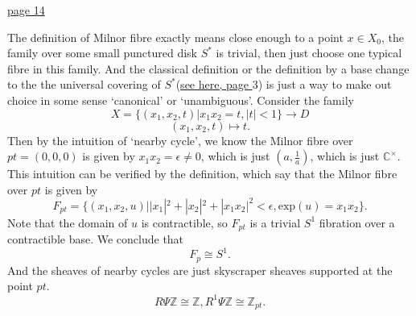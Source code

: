 \documentclass[../main.tex]{subfiles}
\begin{document}
\begin{example}

\end{example}
\begin{example}
\href{http://achinger.impan.pl/thesis.pdf}{page 14}
\end{example}

\begin{example}
The definition of Milnor fibre exactly means close enough to a point $x\in X_{0}$, the family over some small  punctured disk $S^{*}$ is trivial, then just choose one typical fibre in this family. And the classical definition or the definition  by a base change to the the universal covering of $S^{*}$(\href{http://achinger.impan.pl/thesis.pdf}{see here, page $3$}) is just a way to make out choice in some sense `canonical' or `unambiguous'.   Consider the family 
$$X=\{(x_{1}, x_{2}, t)|x_{1}x_{2}=t, |t|<1\}\rightarrow D$$
$$(x_{1}, x_{2}, t)\mapsto t.$$
Then by the intuition of `nearby cycle', we know the Milnor fibre over $pt=(0,0,0)$ is given by $x_{1}x_{2}=\epsilon\neq 0$, which is just $(a, \frac{1}{a})$, which is just $\mathbb{C}^{\times}$.
This intuition can be verified by the definition, which say that the Milnor fibre over $pt$ is given by 
$$F_{pt}=\{(x_{1}, x_{2}, u)||x_{1}|^{2}+|x_{2}|^{2}+|x_{1}x_{2}|^{2}<\epsilon, \mathrm{exp}(u)=x_{1}x_{2}\}.$$
Note that the domain of $u$ is contractible, so $F_{pt}$ is a trivial $S^{1}$ fibration over a contractible base. We conclude that 
$$F_{p}\cong S^{1}.$$
And the sheaves of nearby cycles are just skyscraper sheaves supported at the point $pt$.
$$R\Psi\mathbb{Z}\cong \mathbb{Z}, R^{1}\Psi\mathbb{Z}\cong \mathbb{Z}_{pt}.$$
\end{example}
\end{document}
